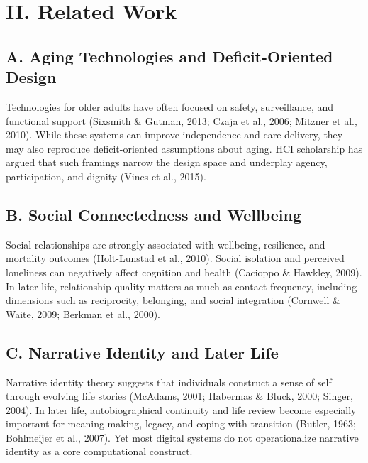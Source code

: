 \documentclass[
  journal,
]{IEEEtran}%
\begin{document}
\section{II. Related Work}\label{ii.-related-work}

\subsection{A. Aging Technologies and Deficit-Oriented
Design}\label{a.-aging-technologies-and-deficit-oriented-design}

Technologies for older adults have often focused on safety,
surveillance, and functional support (Sixsmith \& Gutman, 2013; Czaja et
al., 2006; Mitzner et al., 2010). While these systems can improve
independence and care delivery, they may also reproduce deficit-oriented
assumptions about aging. HCI scholarship has argued that such framings
narrow the design space and underplay agency, participation, and dignity
(Vines et al., 2015).

\subsection{B. Social Connectedness and
Wellbeing}\label{b.-social-connectedness-and-wellbeing}

Social relationships are strongly associated with wellbeing, resilience,
and mortality outcomes (Holt-Lunstad et al., 2010). Social isolation and
perceived loneliness can negatively affect cognition and health
(Cacioppo \& Hawkley, 2009). In later life, relationship quality matters
as much as contact frequency, including dimensions such as reciprocity,
belonging, and social integration (Cornwell \& Waite, 2009; Berkman et
al., 2000).

\subsection{C. Narrative Identity and Later
Life}\label{c.-narrative-identity-and-later-life}

Narrative identity theory suggests that individuals construct a sense of
self through evolving life stories (McAdams, 2001; Habermas \& Bluck,
2000; Singer, 2004). In later life, autobiographical continuity and life
review become especially important for meaning-making, legacy, and
coping with transition (Butler, 1963; Bohlmeijer et al., 2007). Yet most
digital systems do not operationalize narrative identity as a core
computational construct.
\end{document}
